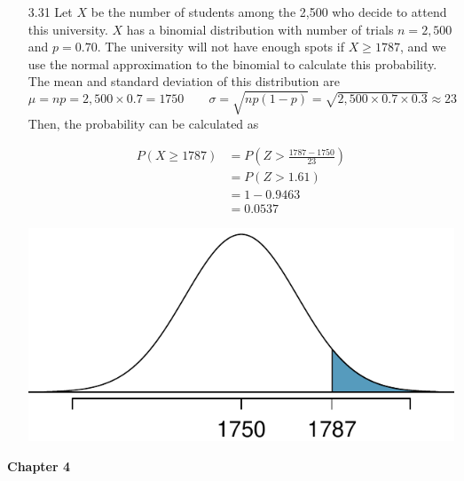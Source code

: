 \documentclass[11pt]{article}
\newenvironment{parts}{
\vspace{-0.25cm}
\begin{enumerate}[(a)]
\setlength{\itemsep}{0mm}
}
{\end{enumerate}
}
\begin{document}
\begin{enumerate}
\begin{parts}
\end{parts}

\item[3.31]
Let $X$ be the number of students among the 2,500 who decide to attend this university. $X$ has a binomial distribution with number of trials $n = 2,500$ and $p = 0.70$.  The university will not have enough spots if $X \ge 1787$, and we use the normal approximation to the binomial to calculate this probability. The mean and standard deviation of this distribution are
\[ \mu = np = 2,500 \times 0.7 = 1750 \qquad \sigma = \sqrt{np(1-p)} = \sqrt{2,500 \times 0.7 \times 0.3} \approx 23 \]
Then, the probability can be calculated as

\begin{minipage}[c]{0.6\textwidth}
\begin{align*}
P(X \ge 1787)  &= P \left( Z > \frac{1787 - 1750}{23} \right) \\
&= P(Z > 1.61) \\
&= 1 -  0.9463 \\
&= 0.0537
\end{align*}
\end{minipage}
\begin{minipage}[c]{0.4\textwidth}
\begin{center}
\includegraphics[width=\textwidth]{figures/03/admission_gt1787}
\end{center}
\end{minipage}

\end{enumerate}

%

\pagebreak

{\Large \textcolor{custom_blue}{\textbf{Chapter 4}}}
\end{document}
